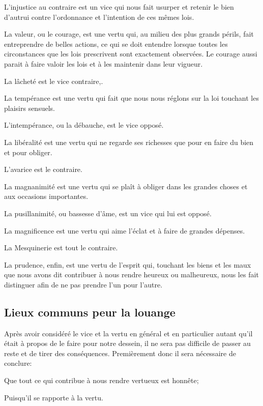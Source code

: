 L'injustice au contraire est un vice qui nous fait usurper et retenir le bien d'autrui contre l'ordonnance et
l'intention de ces mêmes lois.

La valeur, ou le courage, est une vertu qui, au milieu des plus grands périls, fait entreprendre de belles
actions, ce qui se doit entendre lorsque toutes les circonstances que les lois prescrivent sont exactement
observées. Le courage aussi parait à faire valoir les lois et à les maintenir dans leur vigueur.

La lâcheté est le vice contraire,. 

La tempérance est une vertu qui fait que nous nous réglons sur la loi touchant les plaisirs sensuels. 

L'intempérance, ou la débauche, est le vice opposé.

La libéralité est une vertu qui ne regarde ses richesses que pour en faire du bien et pour obliger. 

L'avarice est le contraire. 

La magnanimité est une vertu qui se plaît à obliger dans les grandes choses et aux occasions importantes.

La pusillanimité, ou bassesse d'âme, est un vice qui lui est opposé.

La magnificence est une vertu qui aime l'éclat et à faire de grandes dépenses.

La Mesquinerie est tout le contraire.

La prudence, enfin, est une vertu de l'esprit qui, touchant les biens et les maux que nous avons dit
contribuer à nous rendre heureux ou malheureux, nous les fait distinguer afin de ne pas prendre l'un pour l'autre.

\subsection{Lieux communs peur la louange}

Après avoir considéré le vice et la vertu en général et en particulier autant qu'il était à propos de le faire pour
notre dessein, il ne sera pas difficile de passer au reste et de tirer des conséquences. Premièrement donc il sera
nécessaire de conclure:

\begin{lieu}
	Que tout ce qui contribue à nous rendre vertueux est honnête;
\end{lieu}

Puisqu'il se rapporte à la vertu.

\bigbreak

